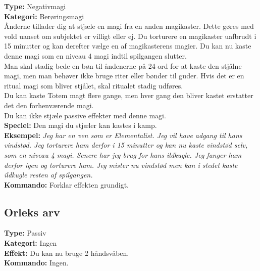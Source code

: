 \begin{meditation*}
\textbf{Type:} Negativmagi \\
\textbf{Kategori:} Berøringsmagi\\
Ånderne tillader dig at stjæle en magi fra en anden magikaster. Dette gøres med vold uanset om subjektet er villigt eller ej. Du torturere en magikaster uafbrudt i 15 minutter og kan derefter vælge en
af magikasterens magier. Du kan nu kaste denne magi som en niveau 4 magi indtil spilgangen slutter.\\
Man skal stadig bede en bøn til åndenerne på 24 ord for at kaste den stjålne magi, men man behøver ikke bruge riter eller bønder til guder. Hvis det er en ritual magi som bliver stjålet, skal ritualet stadig udføres.\\
Du kan kaste Totem magt flere gange, men hver gang den bliver kastet erstatter det den
forhenværende magi.\\
Du kan ikke stjæle passive effekter med denne magi.\\
\textbf{Speciel:} Den magi du stjæler kan kastes i kamp.\\
\textbf{Eksempel:} \textit{Jeg har en ven som er Elementalist. Jeg vil have adgang til hans vindstød. Jeg torturere ham derfor i 15 minutter og kan nu kaste vindstød selv, som en niveau 4 magi. Senere har jeg brug for
hans ildkugle. Jeg fanger ham derfor igen og torturere ham. Jeg mister nu vindstød men kan i stedet kaste ildkugle resten af spilgangen.}\\
\textbf{Kommando:} Forklar effekten grundigt.
\end{meditation*}

\subsection*{Orleks arv}

\begin{orleks arv*}
\textbf{Type:} Passiv\\
\textbf{Kategori:} Ingen\\
\textbf{Effekt:} Du kan nu bruge 2 håndsvåben.\\
\textbf{Kommando:} Ingen.
\end{orleks arv*}

